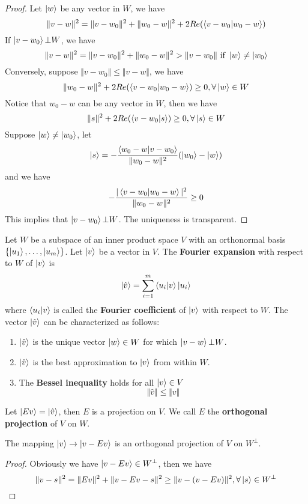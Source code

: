 \documentclass{article}
\begin{document}
\begin{proof}
	Let $\ket{w}$ be any vector in $W$, we have
	\[\Vert v-w\Vert^2=\Vert v-w_0\Vert^2+\Vert w_0-w\Vert^2+2Re(\braket{v-w_0|w_0-w})\]
	If $\ket{v-w_0}\bot W$, we have
	\[\Vert v-w\Vert^2=\Vert v-w_0\Vert^2+\Vert w_0-w\Vert^2>\Vert v-w_0\Vert\text{ if }\ket{w}\neq\ket{w_0}\]
	Conversely, suppose $\Vert v-w_0\Vert\le\Vert v-w\Vert$, we have
	\[\Vert w_0-w\Vert^2+2Re(\braket{v-w_0|w_0-w})\ge0,\forall\ket{w}\in W\]
	Notice that $w_0-w$ can be any vector in $W$, then we have
	\[\Vert s\Vert^2+2Re(\braket{v-w_0|s})\ge0,\forall\ket{s}\in W\]
	Suppose $\ket{w}\neq\ket{w_0}$, let
	\[\ket{s}=-\frac{\braket{w_0-w|v-w_0}}{\Vert w_0-w\Vert^2}(\ket{w_0}-\ket{w})\]
	and we have
	\[-\frac{|\braket{v-w_0|w_0-w}|^2}{\Vert w_0-w\Vert^2}\ge0\]
	This implies that $\ket{v-w_0}\bot W$. The uniqueness is transparent.
\end{proof}
\begin{thm}
	Let $W$ be a subspace of an inner product space $V$ with an orthonormal basis $\{\ket{u_1},\dots,\ket{u_m}\}$. Let $\ket{v}$ be a vector in $V$. The \textbf{Fourier expansion} with respect to $W$ of $\ket{v}$ is
	\[\ket{\hat{v}}=\sum_{i=1}^m\braket{u_i|v}\ket{u_i}\]
	where $\braket{u_i|v}$ is called the \textbf{Fourier coefficient} of $\ket{v}$ with respect to $W$. The vector $\ket{\hat{v}}$ can be characterized as follows:
	\begin{enumerate}
		\item $\ket{\hat{v}}$ is the unique vector $\ket{w}\in W$ for which $\ket{v-w}\bot W$.
		\item $\ket{\hat{v}}$ is the best approximation to $\ket{v}$ from within $W$.
		\item The \textbf{Bessel inequality} holds for all $\ket{v}\in V$
		\[\Vert\hat{v}\Vert\le\Vert v\Vert\]
	\end{enumerate}
\end{thm}
\begin{coro}
	Let $\ket{Ev}=\ket{\hat{v}}$, then $E$ is a projection on $V$. We call $E$ the \textbf{orthogonal projection} of $V$ on $W$.
\end{coro}
\begin{coro}
	The mapping $\ket{v}\rightarrow\ket{v-Ev}$ is an orthogonal projection of $V$ on $W^\bot$.
\end{coro}
\begin{proof}
	Obviously we have $\ket{v-Ev}\in W^\bot$, then we have
	\[\Vert v-s\Vert^2=\Vert Ev\Vert^2+\Vert v-Ev-s\Vert^2\ge \Vert v-(v-Ev)\Vert^2,\forall \ket{s}\in W^\bot\]
\end{proof}
\end{document}
